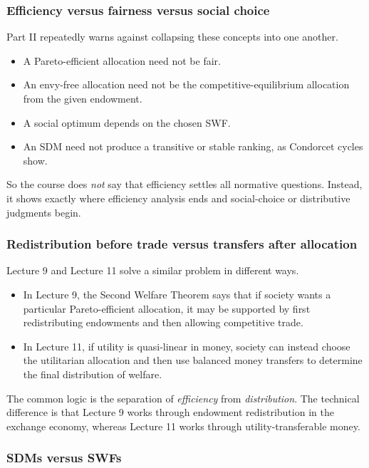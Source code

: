 \subsubsection{Efficiency versus fairness versus social choice}

Part II repeatedly warns against collapsing these concepts into one another.

\begin{itemize}
    \item A Pareto-efficient allocation need not be fair.
    \item An envy-free allocation need not be the competitive-equilibrium allocation from the given endowment.
    \item A social optimum depends on the chosen SWF.
    \item An SDM need not produce a transitive or stable ranking, as Condorcet cycles show.
\end{itemize}

So the course does \emph{not} say that efficiency settles all normative questions. Instead, it shows exactly where efficiency analysis ends and social-choice or distributive judgments begin.

\subsubsection{Redistribution before trade versus transfers after allocation}

Lecture 9 and Lecture 11 solve a similar problem in different ways.

\begin{itemize}
    \item In Lecture 9, the Second Welfare Theorem says that if society wants a particular Pareto-efficient allocation, it may be supported by first redistributing endowments and then allowing competitive trade.
    \item In Lecture 11, if utility is quasi-linear in money, society can instead choose the utilitarian allocation and then use balanced money transfers to determine the final distribution of welfare.
\end{itemize}

The common logic is the separation of \emph{efficiency} from \emph{distribution}. The technical difference is that Lecture 9 works through endowment redistribution in the exchange economy, whereas Lecture 11 works through utility-transferable money.

\subsubsection{SDMs versus SWFs}

